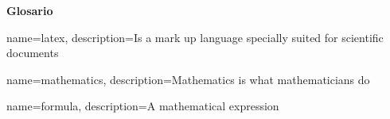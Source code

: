 \fancyhead{}
\fancyfoot{}


\begin{LARGE}
\textbf{Glosario}
\end{LARGE}

{
        name=latex,
        description={Is a mark up language specially suited for 
scientific documents}
}

{
        name=mathematics,
        description={Mathematics is what mathematicians do}
}

{
        name=formula,
        description={A mathematical expression}
}



\printglossary[type=]

\printglossary